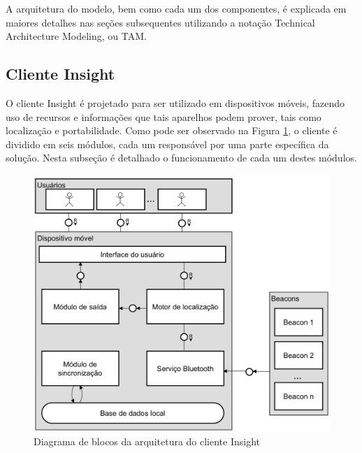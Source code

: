 \documentclass[twoside,english,brazilian]{UNISINOSartigo}
\begin{document}
A arquitetura do modelo, bem como cada um dos componentes, é explicada em maiores detalhes nas seções subsequentes utilizando a notação Technical Architecture Modeling, ou TAM. \cite{SAPTAM}

\subsection{Cliente Insight}
O cliente Insight é projetado para ser utilizado em dispositivos móveis, fazendo uso de recursos e informações que tais aparelhos podem prover, tais como localização e portabilidade. Como pode ser observado na Figura \ref{fig:arquiteturaCliente}, o cliente é dividido em seis módulos, cada um responsável por uma parte específica da solução. Nesta subseção é detalhado o funcionamento de cada um destes módulos.

\FloatBarrier
\begin{figure}[!ht]
	\caption{Diagrama de blocos da arquitetura do cliente Insight}
	\label{fig:arquiteturaCliente}
	\centering%
	\begin{minipage}{.8\textwidth}
		\includegraphics[width=\textwidth]{imgs/arquiteturaCliente.png}
	\end{minipage}
\end{figure}
\FloatBarrier
\end{document}
